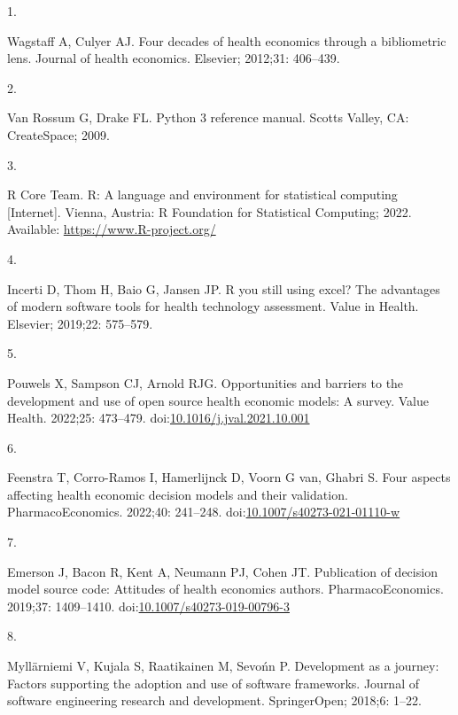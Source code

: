 \documentclass[
]{article}
\newlength{\cslhangindent}
\newlength{\csllabelwidth}
\newlength{\cslentryspacingunit} %
\newenvironment{CSLReferences}[2] %
 {%
  \setlength{\parindent}{0pt}
  \ifodd #1
  \let\oldpar\par
  \def\par{\hangindent=\cslhangindent\oldpar}
  \fi
  \setlength{\parskip}{#2\cslentryspacingunit}
 }%
 {}
\newcommand{\CSLLeftMargin}[1]{\parbox[t]{\csllabelwidth}{#1}}
\newcommand{\CSLRightInline}[1]{\parbox[t]{\linewidth - \csllabelwidth}{#1}\break}
\begin{document}
\hypertarget{refs}{}
\begin{CSLReferences}{0}{0}
\leavevmode{}%
\CSLLeftMargin{1. }%
\CSLRightInline{Wagstaff A, Culyer AJ. Four decades of health economics through a bibliometric lens. Journal of health economics. Elsevier; 2012;31: 406--439. }

\leavevmode{}%
\CSLLeftMargin{2. }%
\CSLRightInline{Van Rossum G, Drake FL. Python 3 reference manual. Scotts Valley, CA: CreateSpace; 2009. }

\leavevmode{}%
\CSLLeftMargin{3. }%
\CSLRightInline{R Core Team. R: A language and environment for statistical computing {[}Internet{]}. Vienna, Austria: R Foundation for Statistical Computing; 2022. Available: \url{https://www.R-project.org/}}

\leavevmode{}%
\CSLLeftMargin{4. }%
\CSLRightInline{Incerti D, Thom H, Baio G, Jansen JP. R you still using excel? The advantages of modern software tools for health technology assessment. Value in Health. Elsevier; 2019;22: 575--579. }

\leavevmode{}%
\CSLLeftMargin{5. }%
\CSLRightInline{Pouwels X, Sampson CJ, Arnold RJG. Opportunities and barriers to the development and use of open source health economic models: A survey. Value Health. 2022;25: 473--479. doi:\href{https://doi.org/10.1016/j.jval.2021.10.001}{10.1016/j.jval.2021.10.001}}

\leavevmode{}%
\CSLLeftMargin{6. }%
\CSLRightInline{Feenstra T, Corro-Ramos I, Hamerlijnck D, Voorn G van, Ghabri S. Four aspects affecting health economic decision models and their validation. PharmacoEconomics. 2022;40: 241--248. doi:\href{https://doi.org/10.1007/s40273-021-01110-w}{10.1007/s40273-021-01110-w}}

\leavevmode{}%
\CSLLeftMargin{7. }%
\CSLRightInline{Emerson J, Bacon R, Kent A, Neumann PJ, Cohen JT. Publication of decision model source code: Attitudes of health economics authors. PharmacoEconomics. 2019;37: 1409--1410. doi:\href{https://doi.org/10.1007/s40273-019-00796-3}{10.1007/s40273-019-00796-3}}

\leavevmode{}%
\CSLLeftMargin{8. }%
\CSLRightInline{Myllärniemi V, Kujala S, Raatikainen M, Sevońn P. Development as a journey: Factors supporting the adoption and use of software frameworks. Journal of software engineering research and development. SpringerOpen; 2018;6: 1--22. }


\end{CSLReferences}
\end{document}
